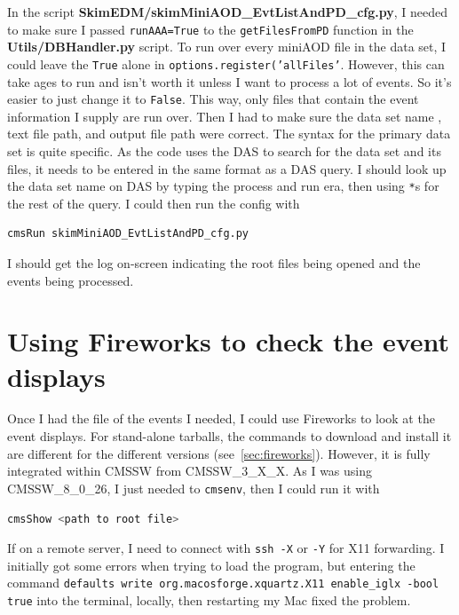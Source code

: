 In the script \textbf{SkimEDM/skimMiniAOD\_EvtListAndPD\_cfg.py}, I needed to make sure I passed \texttt{runAAA=True} to the \texttt{getFilesFromPD} function in the \textbf{Utils/DBHandler.py} script. To run over every miniAOD file in the data set, I could leave the \texttt{True} alone in \texttt{options.register('allFiles'}. However, this can take ages to run and isn't worth it unless I want to process a lot of events. So it's easier to just change it to \texttt{False}. This way, only files that contain the event information I supply are run over. Then I had to make sure the data set name , text file path, and output file path were correct. The syntax for the primary data set is quite specific. As the code uses the DAS to search for the data set and its files, it needs to be entered in the same format as a DAS query. I should look up the data set name on DAS by typing the process and run era, then using \texttt{*}s for the rest of the query. I could then run the config with

\begin{lstlisting}[belowskip=-0.7cm, language=sh, numbers=none]
cmsRun skimMiniAOD_EvtListAndPD_cfg.py
\end{lstlisting}

I should get the log on-screen indicating the root files being opened and the events being processed.


\section{Using Fireworks to check the event displays}

Once I had the \ROOT file of the events I needed, I could use Fireworks to look at the event displays. For stand-alone tarballs, the commands to download and install it are different for the different versions (see~\ref{sec:fireworks}). However, it is fully integrated within CMSSW from CMSSW\_3\_X\_X. As I was using CMSSW\_8\_0\_26, I just needed to \texttt{cmsenv}, then I could run it with

\begin{lstlisting}[belowskip=-0.7cm, language=sh, numbers=none]
cmsShow <path to root file>
\end{lstlisting}

If on a remote server, I need to connect with \texttt{ssh -X} or \texttt{-Y} for X11 forwarding. I initially got some errors when trying to load the program, but entering the command \texttt{defaults write org.macosforge.xquartz.X11 enable\_iglx -bool true} into the terminal, locally, then restarting my Mac fixed the problem.

